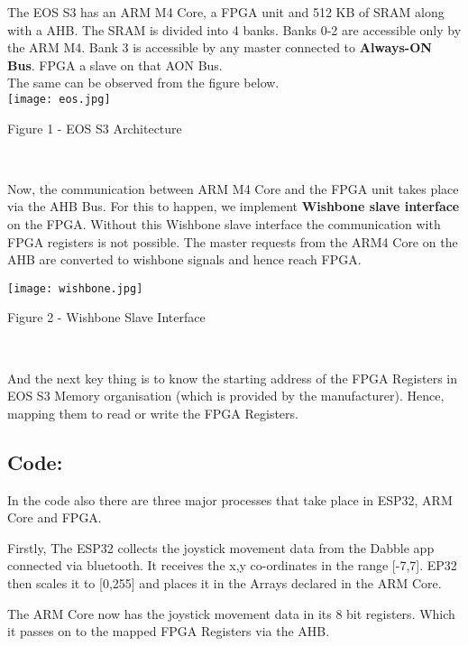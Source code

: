\documentclass[journal,12pt,twocolumn]{IEEEtran}
\begin{document}
The EOS S3 has an ARM M4 Core, a FPGA unit and 512 KB of SRAM along with a AHB. The SRAM is divided into 4 banks. Banks 0-2 are accessible only by the ARM M4. Bank 3 is accessible by any master connected to \textbf{Always-ON Bus}. FPGA a slave on that AON Bus. \\
The same can be observed from the figure below.\\

\vspace{0.5cm}
\texttt{[image: eos.jpg]}
\centerline{Figure 1 - EOS S3 Architecture}
\

Now, the communication between ARM M4 Core and the FPGA unit takes place via the AHB Bus. For this to happen, we implement \textbf{Wishbone slave interface} on the FPGA. Without this Wishbone slave interface the communication with FPGA registers is not possible. The master requests from the ARM4 Core on the AHB are converted to wishbone signals and hence reach FPGA. \\
\vspace{0.25cm}

\texttt{[image: wishbone.jpg]}
\centerline{Figure 2 - Wishbone Slave Interface}
\

And the next key thing is to know the starting address of the FPGA Registers in EOS S3 Memory organisation (which is provided by the manufacturer). Hence, mapping them to read or write the FPGA Registers. 

\raggedright
\subsection{Code: }

In the code also there are three major processes that take place in ESP32, ARM Core and FPGA.\\
\vspace{0.25cm}

Firstly, The ESP32 collects the joystick movement data from the Dabble app connected via bluetooth. It receives the x,y co-ordinates in the range [-7,7]. EP32 then scales it to [0,255] and places it in the Arrays declared in the ARM Core. \\

\vspace{0.25cm}

The ARM Core now has the joystick movement data in its 8 bit registers. Which it passes on to the mapped FPGA Registers via the AHB.\\
\end{document}
